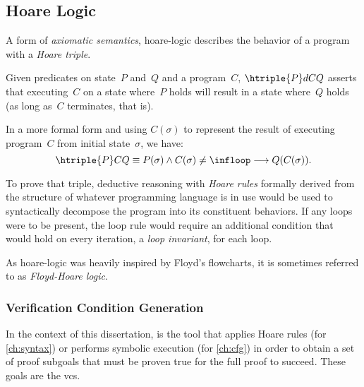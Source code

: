 \subsection{Hoare Logic}\label{se:hoare}
A form of \emph{axiomatic semantics},
\gls{hoare-logic} \autocite{hoare1969axiomatic,myreen2007hoare}
describes the behavior of a program with a \emph{Hoare triple}.
\begin{definition}\label{hoare-triple}
  Given predicates on state~$P$ and~$Q$ and a program~$C$,
  $\htriple{P}dC{Q}$ asserts that executing~$C$ on a state where~$P$ holds
  will result in a state where~$Q$ holds (as long as~$C$ terminates, that is).

  In a more formal form and using $C(\sigma)$ to represent the result
  of executing program~$C$ from initial state~$\sigma$, we have:
  \begin{equation*}
    \htriple{P}C{Q}\equiv P(\sigma)\land C(\sigma)\neq\infloop\longrightarrow
    Q(C(\sigma)).
  \end{equation*}
\end{definition}
To prove that triple, deductive reasoning with \emph{Hoare rules}%
formally derived from the structure of whatever programming language is in use
would be used to syntactically decompose the program into its constituent behaviors.
If any loops were to be present, the loop rule would require an additional condition
that would hold on every iteration, a \emph{loop invariant}, for each loop.

As \gls{hoare-logic} was heavily inspired by Floyd's flowcharts, it is sometimes referred to
as \emph{Floyd-Hoare logic}.

\subsubsection{Verification Condition Generation}
In the context of this dissertation,
 is the tool that applies Hoare rules (for \cref{ch:syntax})
or performs symbolic execution (for \cref{ch:cfg})
in order to obtain a set of proof subgoals
that must be proven true for the full proof to succeed.
These goals are the \glspl{vc}.


